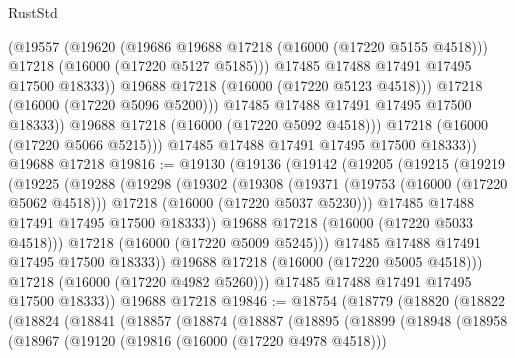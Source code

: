 \begin{lexlean}{RustStd}
\begin{coremodule}
                      (@19557
                        (@19620
                          (@19686 @19688 @17218 (@16000 (@17220 @5155 @4518)))
                          @17218
                          (@16000 (@17220 @5127 @5185)))
                        @17485
                        @17488
                        @17491
                        @17495
                        @17500
                        @18333))
                    @19688
                    @17218
                    (@16000 (@17220 @5123 @4518)))
                  @17218
                  (@16000 (@17220 @5096 @5200)))
                @17485
                @17488
                @17491
                @17495
                @17500
                @18333))
            @19688
            @17218
            (@16000 (@17220 @5092 @4518)))
          @17218
          (@16000 (@17220 @5066 @5215)))
        @17485
        @17488
        @17491
        @17495
        @17500
        @18333))
    @19688
    @17218
@19816 := @19130
    (@19136
      (@19142
        (@19205
          (@19215
            (@19219
              (@19225
                (@19288
                  (@19298
                    (@19302
                      (@19308
                        (@19371
                          (@19753 (@16000 (@17220 @5062 @4518)))
                          @17218
                          (@16000 (@17220 @5037 @5230)))
                        @17485
                        @17488
                        @17491
                        @17495
                        @17500
                        @18333))
                    @19688
                    @17218
                    (@16000 (@17220 @5033 @4518)))
                  @17218
                  (@16000 (@17220 @5009 @5245)))
                @17485
                @17488
                @17491
                @17495
                @17500
                @18333))
            @19688
            @17218
            (@16000 (@17220 @5005 @4518)))
          @17218
          (@16000 (@17220 @4982 @5260)))
        @17485
        @17488
        @17491
        @17495
        @17500
        @18333))
    @19688
    @17218
@19846 := @18754
    (@18779
      (@18820
        (@18822
          (@18824
            (@18841
              (@18857
                (@18874
                  (@18887
                    (@18895
                      (@18899
                        (@18948
                          (@18958
                            (@18967
                              (@19120
                                (@19816 (@16000 (@17220 @4978 @4518)))

\end{coremodule}
\end{lexlean}
